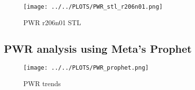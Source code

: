 \vspace{-10pt}

\begin{figure}[H]
\centering
\texttt{[image: ../../PLOTS/PWR\_stl\_r206n01.png]}
\caption{PWR r206n01 STL}
\label{fig:PWR_stl_r206n01}
\end{figure}

\subsection{PWR analysis using Meta's Prophet}


\vspace{-10pt}

\begin{figure}[H]
\centering
\texttt{[image: ../../PLOTS/PWR\_prophet.png]}
\caption{PWR trends}
\label{fig:PWR_prophet}
\end{figure}